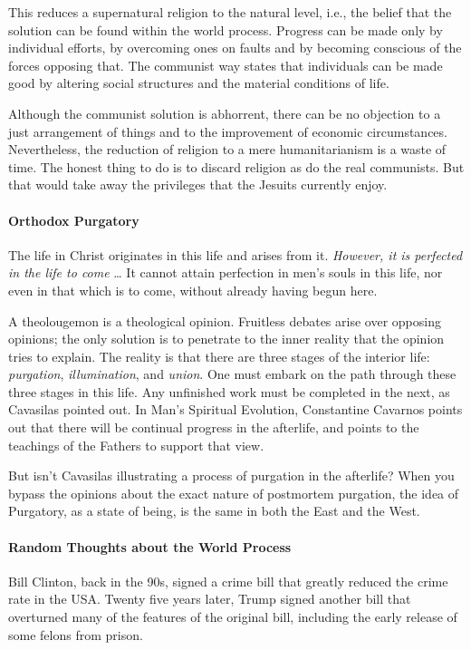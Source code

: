 This reduces a supernatural religion to the natural level, i.e., the belief that the solution can be found within the world process. Progress can be made only by individual efforts, by overcoming ones on faults and by becoming conscious of the forces opposing that. The communist way states that individuals can be made good by altering social structures and the material conditions of life.

Although the communist solution is abhorrent, there can be no objection to a just arrangement of things and to the improvement of economic circumstances. Nevertheless, the reduction of religion to a mere humanitarianism is a waste of time. The honest thing to do is to discard religion as do the real communists. But that would take away the privileges that the Jesuits currently enjoy.

\paragraph{Orthodox Purgatory}
\begin{quotex}
The life in Christ originates in this life and arises from it. \emph{However, it is perfected in the life to come} … It cannot attain perfection in men's souls in this life, nor even in that which is to come, without already having begun here. 

\end{quotex}
A theolougemon is a theological opinion. Fruitless debates arise over opposing opinions; the only solution is to penetrate to the inner reality that the opinion tries to explain. The reality is that there are three stages of the interior life: \emph{purgation}, \emph{illumination}, and \emph{union}. One must embark on the path through these three stages in this life. Any unfinished work must be completed in the next, as Cavasilas pointed out. In Man's Spiritual Evolution, Constantine Cavarnos points out that there will be continual progress in the afterlife, and points to the teachings of the Fathers to support that view.

But isn't Cavasilas illustrating a process of purgation in the afterlife? When you bypass the opinions about the exact nature of postmortem purgation, the idea of Purgatory, as a state of being, is the same in both the East and the West.

\paragraph{Random Thoughts about the World Process}
Bill Clinton, back in the 90s, signed a crime bill that greatly reduced the crime rate in the USA. Twenty five years later, Trump signed another bill that overturned many of the features of the original bill, including the early release of some felons from prison.

